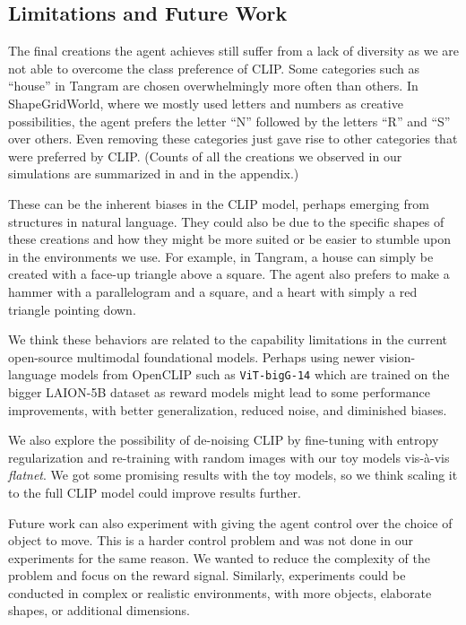 \subsection*{Limitations and Future Work}
\label{sec:future-work}

The final creations the agent achieves still suffer from a lack of diversity as we are not able to overcome the class preference of CLIP.
Some categories such as ``house'' in Tangram are chosen overwhelmingly more often than others.
In ShapeGridWorld, where we mostly used letters and numbers as creative possibilities, the agent prefers the letter ``N'' followed by the letters ``R'' and ``S'' over others.
Even removing these categories just gave rise to other categories that were preferred by CLIP.
(Counts of all the creations we observed in our simulations are summarized in  and  in the appendix.)

These can be the inherent biases in the CLIP model, perhaps emerging from structures in natural language.
They could also be due to the specific shapes of these creations and how they might be more suited or be easier to stumble upon in the environments we use.
For example, in Tangram, a house can simply be created with a face-up triangle above a square.
The agent also prefers to make a hammer with a parallelogram and a square, and a heart with simply a red triangle pointing down.


We think these behaviors are related to the capability limitations in the current open-source multimodal foundational models.
Perhaps using newer vision-language models from OpenCLIP such as \texttt{ViT-bigG-14} \citep{openclip} which are trained on the bigger LAION-5B dataset \citep{laion5b} as reward models might lead to some performance improvements, with better generalization, reduced noise, and diminished biases.

We also explore the possibility of de-noising CLIP by fine-tuning with entropy regularization and re-training with random images with our toy models vis-\`a-vis \emph{flatnet}.
We got some promising results with the toy models, so we think scaling it to the full CLIP model could improve results further.

Future work can also experiment with giving the agent control over the choice of object to move.
This is a harder control problem and was not done in our experiments for the same reason.
We wanted to reduce the complexity of the problem and focus on the reward signal.
Similarly, experiments could be conducted in complex or realistic environments, with more objects, elaborate shapes, or additional dimensions.

